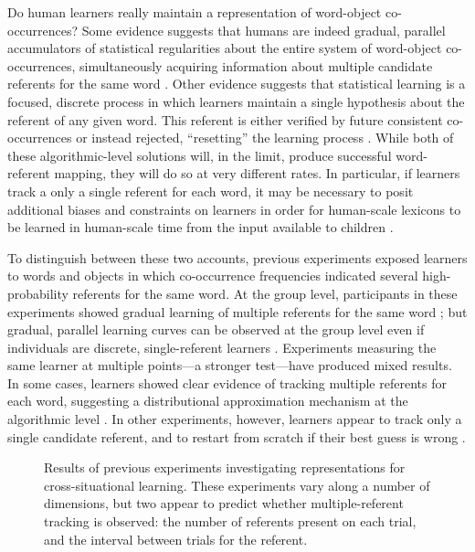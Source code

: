 \documentclass{pnastwo}
\begin{document}
\begin{article}
Do human learners really maintain a representation of word-object co-occurrences? Some evidence suggests that humans are indeed gradual, parallel accumulators of statistical regularities about the entire system of word-object co-occurrences, simultaneously acquiring information about multiple candidate referents for the same word \citep{Vouloumanos2008, McMurray2012, Yurovsky2014}. Other evidence suggests that statistical learning is a focused, discrete process in which learners maintain a single hypothesis about the referent of any given word. This referent is either verified by future consistent co-occurrences or instead rejected, ``resetting'' the learning process \citep{Medina2011, Trueswell2013}. While both of these algorithmic-level solutions will, in the limit, produce successful word-referent mapping, they will do so at very different rates. In particular, if learners track a only a single referent for each word, it may be necessary to posit additional biases and constraints on learners in order for human-scale lexicons to be learned in human-scale time from the input available to children \citep{Vogt2012, Reisenauer2013}.

To distinguish between these two accounts, previous experiments exposed learners to words and objects in which co-occurrence frequencies indicated several high-probability referents for the same word. At the group level, participants in these experiments showed gradual learning of multiple referents for the same word \citep[e.g.,][]{Vouloumanos2008, Yurovsky2013}; but gradual, parallel learning curves can be observed at the group level even if individuals are discrete, single-referent learners \citep{Gallistel2004, Medina2011}. Experiments measuring the same learner at multiple points---a stronger test---have produced mixed results. In some cases, learners showed clear evidence of tracking multiple referents for each word, suggesting a distributional approximation mechanism at the algorithmic level \citep{Smith2011a, Yurovsky2013a, Dautriche2014}. In other experiments, however, learners appear to track only a single candidate referent, and to restart from scratch if their best guess is wrong \citep{Medina2011, Trueswell2013}. 

 \begin{figure}[t]
	\caption{\label{fig:mrefs} Results of previous experiments investigating representations for cross-situational learning. These experiments vary along a number of dimensions, but two appear to predict whether multiple-referent tracking is observed: the number of referents present on each trial, and the interval between trials for the referent.}
\end{figure}


\end{article}
\end{document}
